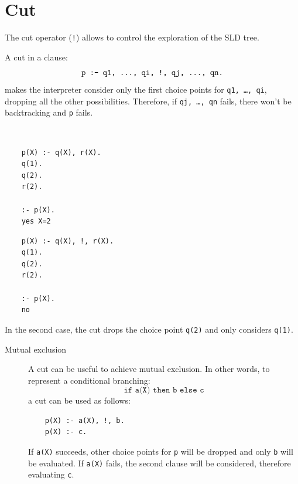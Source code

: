\section{Cut}

The cut operator (\texttt{!}) allows to control the exploration of the SLD tree.

A cut in a clause:
\[ \texttt{p :- q1, \dots, qi, !, qj, \dots, qn.} \]
makes the interpreter consider only the first choice points for \texttt{q1, \dots, qi}, dropping all the other possibilities.
Therefore, if \texttt{qj, \dots, qn} fails, there won't be backtracking and \texttt{p} fails.

\begin{example} \phantom{}\\[0.5em]
    \begin{minipage}{0.5\textwidth}
        \begin{lstlisting}
    p(X) :- q(X), r(X).
    q(1).
    q(2).
    r(2).

    :- p(X).
    yes X=2
        \end{lstlisting}
    \end{minipage}
    \begin{minipage}{0.5\textwidth}
        \begin{lstlisting}
    p(X) :- q(X), !, r(X).
    q(1).
    q(2).
    r(2).

    :- p(X).
    no
        \end{lstlisting}
    \end{minipage}

    In the second case, the cut drops the choice point \texttt{q(2)} and only considers \texttt{q(1)}.
\end{example}

\begin{description}
    \item[Mutual exclusion]
        A cut can be useful to achieve mutual exclusion.
        In other words, to represent a conditional branching:
        \[ \texttt{if a(X) then b else c} \]
        a cut can be used as follows:
        \begin{lstlisting}
    p(X) :- a(X), !, b.
    p(X) :- c.
        \end{lstlisting}

        If \texttt{a(X)} succeeds, other choice points for \texttt{p} will be dropped and only \texttt{b} will be evaluated.
        If \texttt{a(X)} fails, the second clause will be considered, therefore evaluating \texttt{c}.
\end{description}



